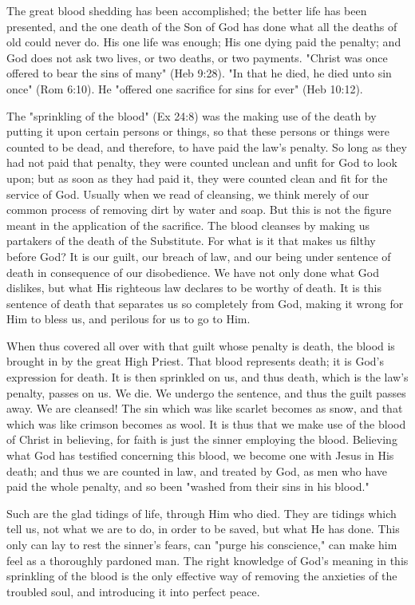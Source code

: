 \documentclass[
]{book}
\begin{document}
The great blood shedding has been accomplished; the better life has been presented, and the one death of the Son of God has done what all the deaths of old could never do. His one life was enough; His one dying paid the penalty; and God does not ask two lives, or two deaths, or two payments. "Christ was once offered to bear the sins of many" (Heb 9:28). "In that he died, he died unto sin once" (Rom 6:10). He "offered one sacrifice for sins for ever" (Heb 10:12).

The "sprinkling of the blood" (Ex 24:8) was the making use of the death by putting it upon certain persons or things, so that these persons or things were counted to be dead, and therefore, to have paid the law's penalty. So long as they had not paid that penalty, they were counted unclean and unfit for God to look upon; but as soon as they had paid it, they were counted clean and fit for the service of God. Usually when we read of cleansing, we think merely of our common process of removing dirt by water and soap. But this is not the figure meant in the application of the sacrifice. The blood cleanses by making us partakers of the death of the Substitute. For what is it that makes us filthy before God? It is our guilt, our breach of law, and our being under sentence of death in consequence of our disobedience. We have not only done what God dislikes, but what His righteous law declares to be worthy of death. It is this sentence of death that separates us so completely from God, making it wrong for Him to bless us, and perilous for us to go to Him.

When thus covered all over with that guilt whose penalty is death, the blood is brought in by the great High Priest. That blood represents death; it is God's expression for death. It is then sprinkled on us, and thus death, which is the law's penalty, passes on us. We die. We undergo the sentence, and thus the guilt passes away. We are cleansed! The sin which was like scarlet becomes as snow, and that which was like crimson becomes as wool. It is thus that we make use of the blood of Christ in believing, for faith is just the sinner employing the blood. Believing what God has testified concerning this blood, we become one with Jesus in His death; and thus we are counted in law, and treated by God, as men who have paid the whole penalty, and so been "washed from their sins in his blood."

Such are the glad tidings of life, through Him who died. They are tidings which tell us, not what we are to do, in order to be saved, but what He has done. This only can lay to rest the sinner's fears, can "purge his conscience," can make him feel as a thoroughly pardoned man. The right knowledge of God's meaning in this sprinkling of the blood is the only effective way of removing the anxieties of the troubled soul, and introducing it into perfect peace.
\end{document}
